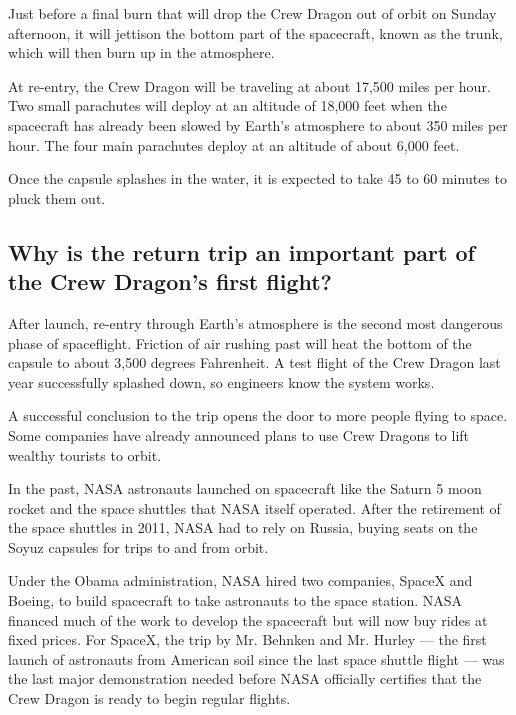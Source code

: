 Just before a final burn that will drop the Crew Dragon out of orbit on
Sunday afternoon, it will jettison the bottom part of the spacecraft,
known as the trunk, which will then burn up in the atmosphere.

At re-entry, the Crew Dragon will be traveling at about 17,500 miles per
hour. Two small parachutes will deploy at an altitude of 18,000 feet
when the spacecraft has already been slowed by Earth's atmosphere to
about 350 miles per hour. The four main parachutes deploy at an altitude
of about 6,000 feet.

Once the capsule splashes in the water, it is expected to take 45 to 60
minutes to pluck them out.

\hypertarget{why-is-the-return-trip-an-important-part-of-the-crew-dragons-first-flight}{%
\subsection{Why is the return trip an important part of the Crew
Dragon's first
flight?}\label{why-is-the-return-trip-an-important-part-of-the-crew-dragons-first-flight}}

After launch, re-entry through Earth's atmosphere is the second most
dangerous phase of spaceflight. Friction of air rushing past will heat
the bottom of the capsule to about 3,500 degrees Fahrenheit. A test
flight of the Crew Dragon last year successfully splashed down, so
engineers know the system works.

A successful conclusion to the trip opens the door to more people flying
to space. Some companies have already announced plans to use Crew
Dragons to lift wealthy tourists to orbit.

In the past, NASA astronauts launched on spacecraft like the Saturn 5
moon rocket and the space shuttles that NASA itself operated. After the
retirement of the space shuttles in 2011, NASA had to rely on Russia,
buying seats on the Soyuz capsules for trips to and from orbit.

Under the Obama administration, NASA hired two companies, SpaceX and
Boeing, to build spacecraft to take astronauts to the space station.
NASA financed much of the work to develop the spacecraft but will now
buy rides at fixed prices. For SpaceX, the trip by Mr. Behnken and Mr.
Hurley --- the first launch of astronauts from American soil since the
last space shuttle flight --- was the last major demonstration needed
before NASA officially certifies that the Crew Dragon is ready to begin
regular flights.

